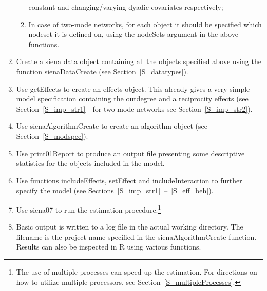 \documentclass[a4paper,fleqn,11pt]{article}
\newcommand{\+}{\, + \,}
\newcommand{\sfn}[1]{\textsf{#1}}
\newcommand{\R}{{\sf R }}
\begin{document}
\begin{enumerate}
\begin{enumerate}
                constant and changing/varying dyadic covariates respectively;
		\item	In case of two-mode networks, for each object it should
                be specified which nodeset it is defined on, using the
                \sfn{nodeSets} argument in the above functions.
	\end{enumerate}
	\item	Create a \textsf{siena} data object containing all the objects
            specified above using the function \sfn{sienaDataCreate}
            (see Section~\ref{S_datatypes}).
	\item	Use \sfn{getEffects} to create an effects object.
            This already gives a very simple model specification
            containing the outdegree and a reciprocity effects
            (see Section~\ref{S_imp_str1} - for two-mode networks see
            Section~\ref{S_imp_str2}).
	\item	Use \sfn{sienaAlgorithmCreate} to create an algorithm object
                (see Section~\ref{S_modspec}).
	\item	Use \sfn{print01Report} to produce an output file
                 presenting some descriptive statistics
                for the objects included in the model.
	\item	Use functions \sfn{includeEffects}, \sfn{setEffect} and
            \sfn{includeInteraction} to further specify the model
            (see Sections~\ref{S_imp_str1}~--~\ref{S_eff_beh}).
	\item	Use \sfn{siena07} %
            to run the estimation procedure.\footnote{The
            use of multiple processes can speed up the estimation.
            For directions on how to utilize multiple processors,
            see Section~\ref{S_multipleProcesses}.}
	\item	Basic output is written to a log file in the actual working directory.
             The filename is the project name specified in the
             \sfn{sienaAlgorithmCreate} function. Results can also be
             inspected in \R using various functions.
\end{enumerate}
\end{document}
